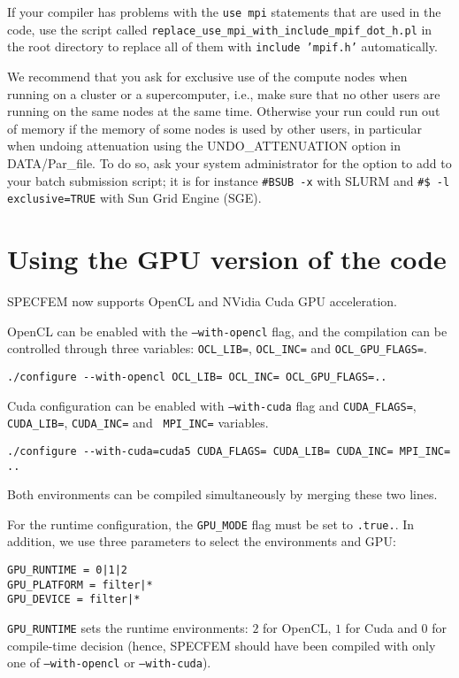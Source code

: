 If your compiler has problems with the \texttt{use mpi} statements that are used in the code, use the script called
\texttt{replace\_use\_mpi\_with\_include\_mpif\_dot\_h.pl} in the root directory to replace all of them with \texttt{include 'mpif.h'} automatically.

We recommend that you ask for exclusive use of the compute nodes when running on a cluster or a supercomputer, i.e., make sure that no other users
are running on the same nodes at the same time. Otherwise your run could run out of memory if the memory of some nodes is used by other users, in particular
when undoing attenuation using the UNDO\_ATTENUATION option in DATA/Par\_file.
To do so, ask your system administrator for the option to add to your batch submission script; it is for instance
\texttt{\#BSUB -x} with SLURM and \texttt{\#\$ -l exclusive=TRUE} with Sun Grid Engine (SGE).

\section{Using the GPU version of the code}

SPECFEM now supports OpenCL and NVidia Cuda GPU acceleration.

OpenCL can be enabled with the \texttt{--with-opencl} flag, and the
compilation can be controlled through three variables: \texttt{OCL\_LIB=},
\texttt{OCL\_INC=} and \texttt{OCL\_GPU\_FLAGS=}.
\begin{verbatim}
./configure --with-opencl OCL_LIB= OCL_INC= OCL_GPU_FLAGS=..
\end{verbatim}

Cuda configuration can be enabled with \texttt{--with-cuda} flag and
\texttt{CUDA\_FLAGS=}, \texttt{CUDA\_LIB=}, \texttt{CUDA\_INC=}
and \texttt{ MPI\_INC=} variables.
\begin{verbatim}
./configure --with-cuda=cuda5 CUDA_FLAGS= CUDA_LIB= CUDA_INC= MPI_INC= ..
\end{verbatim}

Both environments can be compiled simultaneously by merging these two lines.

For the runtime configuration, the \texttt{GPU\_MODE} flag must be set
to \texttt{.true.}. In addition, we use three parameters to select the
environments and GPU:
\begin{verbatim}
GPU_RUNTIME = 0|1|2
GPU_PLATFORM = filter|*
GPU_DEVICE = filter|*
\end{verbatim}

\texttt{GPU\_RUNTIME} sets the runtime environments: $2$ for OpenCL,
$1$ for Cuda and 0 for compile-time decision (hence, SPECFEM should
have been compiled with only one of \texttt{--with-opencl} or \texttt{--with-cuda}).

